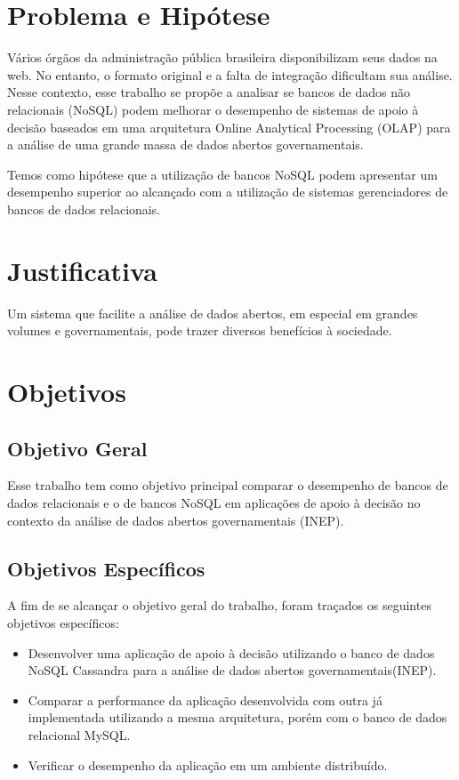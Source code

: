 \section{Problema e Hipótese}
Vários órgãos da administração pública brasileira disponibilizam seus dados na web. No entanto, o formato original e a falta de integração dificultam sua análise. Nesse contexto, esse trabalho se propõe a analisar se bancos de dados não relacionais (NoSQL) podem melhorar o desempenho de sistemas de apoio à decisão baseados em uma arquitetura Online Analytical Processing (OLAP) para a análise de uma grande massa de dados abertos governamentais.

Temos como hipótese que a utilização de bancos NoSQL podem apresentar um desempenho superior ao alcançado com a utilização de sistemas gerenciadores de bancos de dados relacionais.

\section{Justificativa}
Um sistema que facilite a análise de dados abertos, em especial em grandes volumes e governamentais, pode trazer diversos benefícios à sociedade.

\section{Objetivos}

\subsection{Objetivo Geral}
Esse trabalho tem como objetivo principal comparar o desempenho de bancos de dados relacionais e o de bancos NoSQL em aplicações de apoio à decisão no contexto da análise de dados abertos governamentais (INEP).

\subsection{Objetivos Específicos}
A fim de se alcançar o objetivo geral do trabalho, foram traçados os seguintes objetivos específicos:
\begin{itemize}
		\item Desenvolver uma aplicação de apoio à decisão utilizando o banco de dados NoSQL Cassandra para a análise de dados abertos governamentais(INEP).
		
		\item Comparar a performance da aplicação desenvolvida com outra já implementada utilizando a mesma arquitetura, porém com o banco de dados relacional MySQL.
		
		\item Verificar o desempenho da aplicação em um ambiente distribuído.
\end{itemize}

